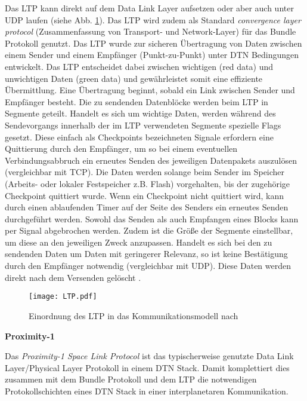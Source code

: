 Das \gls{LTP} kann direkt auf dem Data Link Layer
aufsetzen oder aber auch unter \gls{UDP} laufen (siehe Abb. \ref{fig:LTP}). Das \gls{LTP}
wird zudem als Standard \textit{convergence layer protocol} (Zusammenfassung von
Transport- und Network-Layer) f{\"u}r das Bundle Protokoll genutzt. Das \gls{LTP}
wurde zur sicheren {\"U}bertragung von Daten zwischen einem Sender und einem
Empf{\"a}nger (Punkt-zu-Punkt) unter \gls{DTN} Bedingungen entwickelt. Das \gls{LTP}
entscheidet dabei zwischen wichtigen (red data) und unwichtigen Daten (green
data) und gew{\"a}hrleistet somit eine effiziente {\"U}bermittlung. Eine
{\"U}bertragung beginnt, sobald ein Link zwischen Sender und Empf{\"a}nger
besteht. Die zu sendenden Datenbl{\"o}cke werden beim \gls{LTP} in Segmente geteilt.
Handelt es sich um wichtige Daten, werden w{\"a}hrend des Sendevorgangs
innerhalb der im \gls{LTP} verwendeten Segmente spezielle Flags gesetzt.
Diese einfach als Checkpoints bezeichneten Signale erfordern eine Quittierung
durch den Empf{\"a}nger, um so bei einem eventuellen Verbindungsabbruch ein
erneutes Senden des jeweiligen Datenpakets auszul{\"o}sen (vergleichbar mit
\gls{TCP}). Die Daten werden solange beim Sender im Speicher (Arbeits- oder lokaler
Festspeicher z.B. Flash) vorgehalten, bis der zugeh{\"o}rige Checkpoint
quittiert wurde. Wenn ein Checkpoint nicht quittiert wird, kann durch einen
ablaufenden Timer auf der Seite des Senders ein erneutes Senden durchgeführt
werden. Sowohl das Senden als auch Empfangen eines Blocks kann per Signal
abgebrochen werden. Zudem ist die Gr{\"o}{\ss}e der Segmente einstellbar, um
diese an den jeweiligen Zweck anzupassen. Handelt es sich bei den zu sendenden
Daten um Daten mit geringerer Relevanz, so ist keine Best{\"a}tigung durch den
Empf{\"a}nger notwendig (vergleichbar mit \gls{UDP}).
Diese Daten werden direkt nach dem Versenden gel{\"o}scht \cite{web4}.

\begin{figure}[H]
	\centering
	\texttt{[image: LTP.pdf]}
	\caption[Einordnung des LTP in das Kommunikationsmodell]{Einordnung des LTP in
	das Kommunikationsmodell nach \cite{Burleigh}}
	\label{fig:LTP}
\end{figure}

\textbf{Proximity-1}

Das \textit{Proximity-1 Space Link Protocol} ist das typischerweise genutzte
Data Link Layer/Physical Layer Protokoll in einem \gls{DTN} Stack. Damit komplettiert
dies zusammen mit dem Bundle Protokoll und dem \gls{LTP} die notwendigen
Protokollschichten eines \gls{DTN} Stack in einer interplanetaren Kommunikation.

